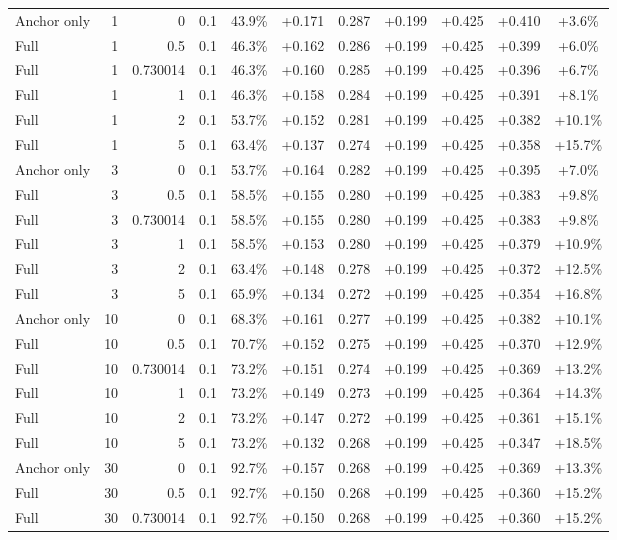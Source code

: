 \begin{table}[htbp]
\begin{tabular}{lrrrccccccc}
Anchor only & 1 & 0 & 0.1 & 43.9\% & +0.171 & 0.287 & +0.199 & +0.425 & +0.410 & +3.6\% \\
Full & 1 & 0.5 & 0.1 & 46.3\% & +0.162 & 0.286 & +0.199 & +0.425 & +0.399 & +6.0\% \\
Full & 1 & 0.730014 & 0.1 & 46.3\% & +0.160 & 0.285 & +0.199 & +0.425 & +0.396 & +6.7\% \\
Full & 1 & 1 & 0.1 & 46.3\% & +0.158 & 0.284 & +0.199 & +0.425 & +0.391 & +8.1\% \\
Full & 1 & 2 & 0.1 & 53.7\% & +0.152 & 0.281 & +0.199 & +0.425 & +0.382 & +10.1\% \\
Full & 1 & 5 & 0.1 & 63.4\% & +0.137 & 0.274 & +0.199 & +0.425 & +0.358 & +15.7\% \\
Anchor only & 3 & 0 & 0.1 & 53.7\% & +0.164 & 0.282 & +0.199 & +0.425 & +0.395 & +7.0\% \\
Full & 3 & 0.5 & 0.1 & 58.5\% & +0.155 & 0.280 & +0.199 & +0.425 & +0.383 & +9.8\% \\
Full & 3 & 0.730014 & 0.1 & 58.5\% & +0.155 & 0.280 & +0.199 & +0.425 & +0.383 & +9.8\% \\
Full & 3 & 1 & 0.1 & 58.5\% & +0.153 & 0.280 & +0.199 & +0.425 & +0.379 & +10.9\% \\
Full & 3 & 2 & 0.1 & 63.4\% & +0.148 & 0.278 & +0.199 & +0.425 & +0.372 & +12.5\% \\
Full & 3 & 5 & 0.1 & 65.9\% & +0.134 & 0.272 & +0.199 & +0.425 & +0.354 & +16.8\% \\
Anchor only & 10 & 0 & 0.1 & 68.3\% & +0.161 & 0.277 & +0.199 & +0.425 & +0.382 & +10.1\% \\
Full & 10 & 0.5 & 0.1 & 70.7\% & +0.152 & 0.275 & +0.199 & +0.425 & +0.370 & +12.9\% \\
Full & 10 & 0.730014 & 0.1 & 73.2\% & +0.151 & 0.274 & +0.199 & +0.425 & +0.369 & +13.2\% \\
Full & 10 & 1 & 0.1 & 73.2\% & +0.149 & 0.273 & +0.199 & +0.425 & +0.364 & +14.3\% \\
Full & 10 & 2 & 0.1 & 73.2\% & +0.147 & 0.272 & +0.199 & +0.425 & +0.361 & +15.1\% \\
Full & 10 & 5 & 0.1 & 73.2\% & +0.132 & 0.268 & +0.199 & +0.425 & +0.347 & +18.5\% \\
Anchor only & 30 & 0 & 0.1 & 92.7\% & +0.157 & 0.268 & +0.199 & +0.425 & +0.369 & +13.3\% \\
Full & 30 & 0.5 & 0.1 & 92.7\% & +0.150 & 0.268 & +0.199 & +0.425 & +0.360 & +15.2\% \\
Full & 30 & 0.730014 & 0.1 & 92.7\% & +0.150 & 0.268 & +0.199 & +0.425 & +0.360 & +15.2\% \\

\end{tabular}
\end{table}
